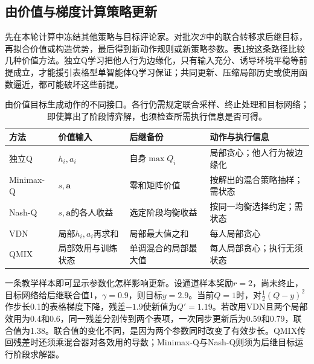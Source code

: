 \subsection{由价值与梯度计算策略更新}
\label{sec:rl-multi-agent-update}

先在本轮计算中冻结其他策略与目标评论家。对批次$\mathcal B$中的联合转移求后继目标，再拟合价值或构造优势，最后得到新动作规则或新策略参数。表\ref{tab:rl-multi-agent-value-updates}按这条路径比较几种价值方法。独立Q学习把他人行为边缘化，只有输入充分、诱导环境平稳等前提成立，才能援引表格型单智能体Q学习保证；共同更新、压缩局部历史或使用函数逼近，都可能破坏这些前提。

\begin{table}[htbp]
 \centering
 \begin{tabularx}{\linewidth}{@{}l >{\raggedright\arraybackslash}X >{\raggedright\arraybackslash}X >{\raggedright\arraybackslash}X@{}}
 \toprule
 方法 & 价值输入 & 后继备份 & 动作与执行信息\\
 \midrule
 独立Q & $h_i,a_i$ & 自身$\max Q_i$ & 局部贪心；他人行为被边缘化\\
 Minimax-Q & $s,\bm a$ & 零和矩阵价值 & 按解出的混合策略抽样；需状态\\
 Nash-Q & $s,\bm a$的各人收益 & 选定阶段均衡收益 & 按同一均衡选择约定；需状态\\
 VDN & 局部$h_i,a_i$再求和 & 局部最大值之和 & 每人局部贪心\\
 QMIX & 局部效用与训练状态 & 单调混合的局部最大值 & 每人局部贪心；执行无须状态\\
 \bottomrule
 \end{tabularx}
 \caption{由价值目标生成动作的不同接口。各行仍需规定联合采样、终止处理和目标网络；即使算出了阶段博弈解，也须检查所需执行信息是否可得。}
 \label{tab:rl-multi-agent-value-updates}
\end{table}

一条教学样本即可显示参数化怎样影响更新。设通道样本奖励$r=2$，尚未终止，目标网络给后继联合值1，$\gamma=0.9$，则目标$y=2.9$。当前$Q=1$时，对$\tfrac12(Q-y)^2$作步长0.1的表格梯度下降，残差$-1.9$使新值为$Q'=1.19$。若改用VDN且两个局部效用为0.4和0.6，同一残差分别传到两个表项，一次同步更新后为0.59和0.79，联合值为1.38。联合值的变化不同，是因为两个参数同时改变了有效步长。QMIX传回残差时还须乘混合器对各效用的导数；Minimax-Q与Nash-Q则须为后继目标运行阶段求解器。

